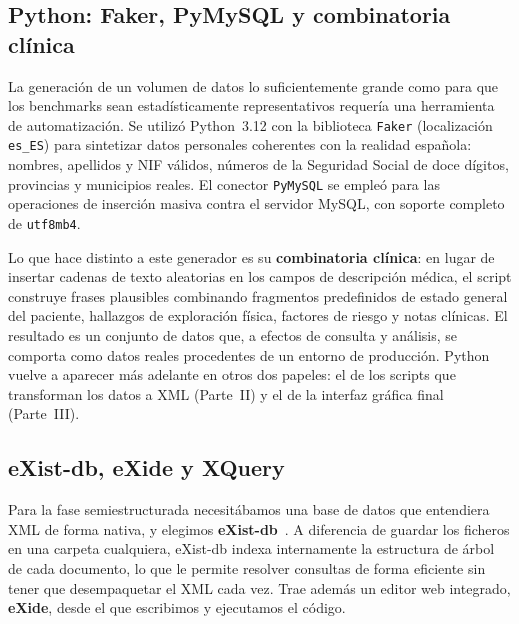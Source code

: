 \documentclass[../main.tex]{subfiles}
\begin{document}
\subsection{Python: Faker, PyMySQL y combinatoria clínica}

La generación de un volumen de datos lo suficientemente grande como para que los benchmarks sean estadísticamente representativos requería una herramienta de automatización. Se utilizó Python~3.12 con la biblioteca \texttt{Faker} (localización \texttt{es\_ES}) para sintetizar datos personales coherentes con la realidad española: nombres, apellidos y NIF válidos, números de la Seguridad Social de doce dígitos, provincias y municipios reales. El conector \texttt{PyMySQL} se empleó para las operaciones de inserción masiva contra el servidor MySQL, con soporte completo de \texttt{utf8mb4}.

Lo que hace distinto a este generador es su \textbf{combinatoria clínica}: en lugar de insertar cadenas de texto aleatorias en los campos de descripción médica, el script construye frases plausibles combinando fragmentos predefinidos de estado general del paciente, hallazgos de exploración física, factores de riesgo y notas clínicas. El resultado es un conjunto de datos que, a efectos de consulta y análisis, se comporta como datos reales procedentes de un entorno de producción. Python vuelve a aparecer más adelante en otros dos papeles: el de los scripts que transforman los datos a XML (Parte~II) y el de la interfaz gráfica final (Parte~III).

\subsection{eXist-db, eXide y XQuery}

Para la fase semiestructurada necesitábamos una base de datos que entendiera XML de forma nativa, y elegimos \textbf{eXist-db}~\cite{existdb}. A diferencia de guardar los ficheros en una carpeta cualquiera, eXist-db indexa internamente la estructura de árbol de cada documento, lo que le permite resolver consultas de forma eficiente sin tener que desempaquetar el XML cada vez. Trae además un editor web integrado, \textbf{eXide}, desde el que escribimos y ejecutamos el código.
\end{document}
